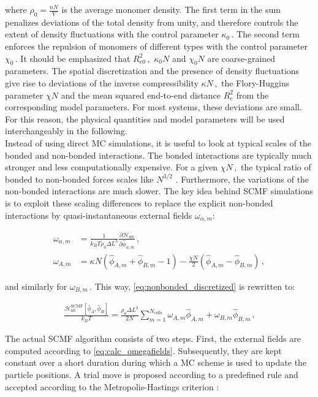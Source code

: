 \documentclass[bachelor,       %
               oneside,        %
               BCOR10mm,       %
               ngerman, english %
               ]{GAUBM}
\begin{document}
where $\rho_0=\frac{nN}{V}$ is the average monomer density. The first term in the sum penalizes deviations of the total density from unity, and therefore controls the extent of density fluctuations with the control parameter $\kappa_0\,.$ The second term enforces the repulsion of monomers of different types with the control parameter $\chi_0\,.$ It should be emphasized that $R_{e0}^2\,,$ $\kappa_0N$ and $\chi_0N$ are coarse-grained parameters. The spatial discretization and the presence of density fluctuations give rise to deviations of the inverse compressibility $\kappa N\,,$ the Flory-Huggins parameter $\chi N$ and the mean squared end-to-end distance $R_e^2$ from the corresponding model parameters. For most systems, these deviations are small. For this reason, the physical quantities and model parameters will be used interchangeably in the following. \\
Instead of using direct \ac{MC} simulations, it is useful to look at typical scales of the bonded and non-bonded interactions. The bonded interactions are typically much stronger and less computationally expensive. For a given $\chi N\,,$ the typical ratio of bonded to non-bonded forces scales like $N^{3/2}$ \cite{Mueller_daoulas11}. Furthermore, the variations of the non-bonded interactions are much slower. The key idea behind \ac{SCMF} simulations is to exploit these scaling differences to replace the explicit non-bonded interactions by quasi-instantaneous external fields $\omega_{\alpha,m}$:


\begin{align}
    \omega_{\alpha,m}&=\frac{1}{k_BT\rho_0\Delta L^3}\frac{\partial \mathcal H_{\text{nb}}}{\partial \hat\phi_{\alpha,m}}\,,\nonumber \\
    \omega_{A,m}&=\kappa N\left(\hat\phi_{A,m}+\hat\phi_{B,m}-1\right)-\frac{\chi N}{2}\left(\hat\phi_{A,m}-\hat\phi_{B,m}\right)\,,
    \label{eq:calc_omegafields}
\end{align}

and similarly for $\omega_{B,m}\,.$ This way, \autoref{eq:nonbonded_discretized} is rewritten to:

\begin{align}
    \frac{\mathcal H_\text{nb}^{\text{SCMF}}[\hat\phi_A,\hat\phi_B]}{k_BT}=\frac{\rho_0\Delta L^3}{2N}\sum_{m=1}^{N_\text{cells}}\omega_{A,m}\hat\phi_{A,m}+\omega_{B,m}\hat\phi_{B,m}\,.
\end{align}

The actual \ac{SCMF} algorithm consists of two steps. First, the external fields are computed according to \autoref{eq:calc_omegafields}. Subsequently, they are kept constant over a short duration during which a \ac{MC} scheme is used to update the particle positions. A trial move is proposed according to a predefined rule and accepted according to the Metropolis-Hastings criterion \cite{metropolis}:
\end{document}
